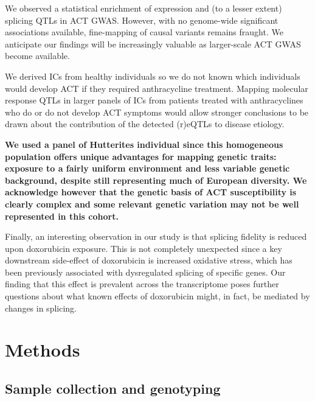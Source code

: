 \documentclass{article}
\newcommand{\tempbold}[1]{\textbf{#1}}
\begin{document}
We observed a statistical enrichment of expression and (to a lesser extent) splicing  QTLs in ACT GWAS. However, with no genome-wide significant associations available, fine-mapping of causal variants remains fraught. We anticipate our findings will be increasingly valuable as larger-scale ACT GWAS become available. 

We derived ICs from healthy individuals so we do not known which individuals would develop ACT if they required anthracycline treatment. Mapping molecular response QTLs in larger panels of ICs from patients treated with anthracyclines who do or do not develop ACT symptoms would allow stronger conclusions to be drawn about the contribution of the detected (r)eQTLs to disease etiology. 

\tempbold{We used a panel of Hutterites individual since this homogeneous population offers unique advantages for mapping genetic traits: exposure to a fairly uniform environment and less variable genetic background, despite still representing much of European diversity\cite{Newman2004-ms}. We acknowledge however that the genetic basis of ACT susceptibility is clearly complex and some relevant genetic variation may not be well represented in this cohort.}

Finally, an interesting observation in our study is that splicing fidelity is reduced upon doxorubicin exposure. This is not completely unexpected since a key downstream side-effect of doxorubicin is increased oxidative stress, which has been previously associated with dysregulated splicing of specific genes\cite{Disher2007,Seo2016}. Our finding that this effect is prevalent across the transcriptome poses further questions about what known effects of  doxorubicin might, in fact, be mediated by changes in splicing. 


\section*{Methods} 

\subsection*{Sample collection and genotyping}
\end{document}
